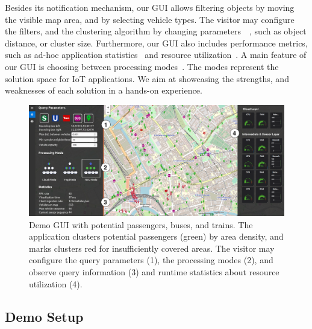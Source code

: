 Besides its notification mechanism, our GUI allows filtering objects by moving the visible map area, and by selecting vehicle types. The visitor may configure the filters, and the clustering algorithm by changing parameters~~, such as object distance, or cluster size. 
Furthermore, our GUI also includes performance metrics, such as ad-hoc application statistics~ and resource utilization~. 
A main feature of our GUI is choosing between processing modes~. The modes represent the solution space for IoT applications. We aim at showcasing the strengths, and weaknesses of each solution in a hands-on experience.
\begin{figure}[t!]
  \centering
  \includegraphics[width=\textwidth]{figs/MapWithClusters_Metrics.png}
  \caption{Demo GUI with potential passengers, buses, and trains. The application clusters potential passengers (green) by area density, and marks clusters red for insufficiently covered areas. The visitor may configure the query parameters (1), the processing modes (2), and observe query information (3) and runtime statistics about resource utilization (4).}
  \label{fig:screenshot}
\end{figure}



\subsection{Demo Setup}
\label{subsec:setup}

